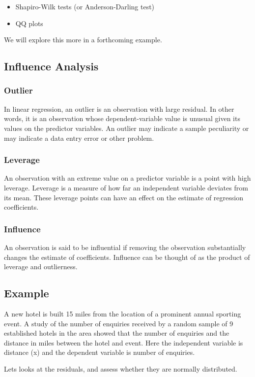 \documentclass[ModuleBmain.tex]{subfiles}
\begin{document}
\begin{itemize} \item 	Shapiro-Wilk tests (or Anderson-Darling test)
\item 	QQ plots
\end{itemize}

We will explore this more in a forthcoming example.
\subsection{Influence Analysis}


\subsubsection{Outlier} In linear regression, an outlier is an observation with large residual.  In other words, it is an observation whose dependent-variable value is unusual given its values on the predictor variables.  An outlier may indicate a sample peculiarity or may indicate a data entry error or other problem.
\subsubsection{Leverage}  An observation with an extreme value on a predictor variable is a point with high leverage.  Leverage is a measure of how far an independent variable deviates from its mean.  These leverage points can have an effect on the estimate of regression coefficients.

\subsubsection{Influence} An observation is said to be influential if removing the observation substantially changes the estimate of coefficients.  Influence can be thought of as the product of leverage and outlierness.
\subsection{Example}
A new hotel is built 15 miles from the location of a prominent annual sporting event. A study of the number of enquiries received by a random sample of 9 established hotels in the area showed that the number of enquiries and the distance in miles between the hotel and event. Here the independent variable is distance (x) and the dependent variable is number of enquiries.

Lets looks at the residuals, and assess whether they are normally distributed.
\end{document}
